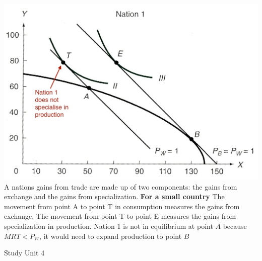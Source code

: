 \documentclass[12pt]{examnotes}
\begin{document}
\includegraphics[scale=0.35]{./imgs/25.jpg}
\ra A nations gains from trade are made up of two components: the gains from exchange and the gains from specialization. 
{\bf For a small country}
\ra The movement from point A to point T in consumption measures the gains from exchange.
\ra The movement from point T to point E measures the gains from specialization in production.
\ra Nation 1 is not in equilibrium at point $A$ because $MRT < P_W$, it would need to expand production to point $B$ 

\h{Study Unit 4}
\end{document}
